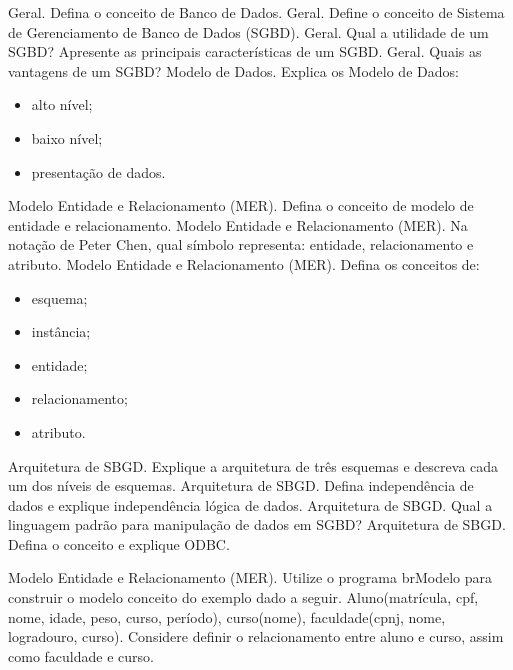 \documentclass[12pt,answers]{exam}
\begin{document}
\begin{questions}


\question Geral. Defina o conceito de Banco de Dados.
\question Geral. Define o conceito de Sistema de Gerenciamento de Banco de Dados (SGBD).
\question Geral. Qual a utilidade de um SGBD? Apresente as principais características de um SGBD.
\question Geral. Quais as vantagens de um SGBD?
\question Modelo de Dados. Explica os Modelo de Dados:
\begin{itemize}
    \item alto nível;
    \item baixo nível;
    \item presentação de dados.
\end{itemize}
\question Modelo Entidade e Relacionamento (MER). Defina o conceito de modelo de entidade e relacionamento.
\question Modelo Entidade e Relacionamento (MER). Na notação de Peter Chen, qual símbolo representa: entidade, relacionamento e atributo.
\question Modelo Entidade e Relacionamento (MER). Defina os conceitos de:
\begin{itemize}
    \item esquema;
    \item instância;
    \item entidade;
    \item relacionamento;
    \item atributo.
\end{itemize}

\question Arquitetura de SBGD. Explique a arquitetura de três esquemas e descreva cada um dos níveis de esquemas.
\question Arquitetura de SBGD. Defina independência de dados e explique independência lógica de dados.
\question Arquitetura de SBGD. Qual a linguagem padrão para manipulação de dados em SGBD?
\question Arquitetura de SBGD. Defina o conceito e explique ODBC.

\question Modelo Entidade e Relacionamento (MER). Utilize o programa brModelo para construir o modelo conceito do exemplo dado a seguir. Aluno(matrícula, cpf, nome, idade, peso, curso, período), curso(nome), faculdade(cpnj, nome, logradouro, curso). Considere definir o relacionamento entre aluno e curso, assim como faculdade e curso.


\end{questions}
\end{document}

